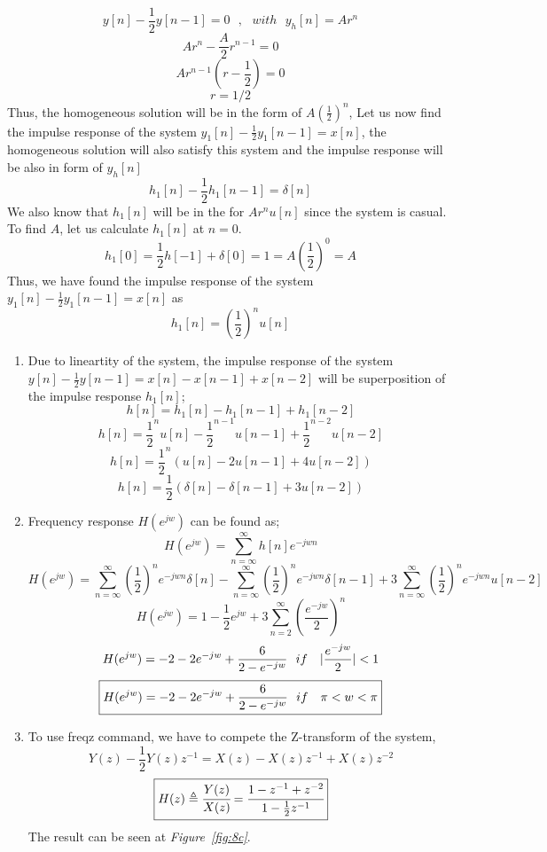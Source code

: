\documentclass[a4paper,12pt]{article}
\begin{document}
\begin{enumerate}
	$$	y[n]-\frac{1}{2}y[n-1]=0 ~~~,~~~with~~~y_h[n]=Ar^n	$$
	$$	Ar^n-\frac{A}{2}r^{n-1}=0	$$	
	$$ 	Ar^{n-1}(r-\frac{1}{2})=0	$$
	$$	\boxed {r=1/2} $$
	Thus, the homogeneous solution will be in the form of $A{(\frac{1}{2})}^{n}$,
	Let us now find the impulse response of the system $y_1[n]-\frac{1}{2}y_1[n-1]=x[n]$, the homogeneous solution will also satisfy this system and the impulse response will be also in form of  $y_h[n]$
	$$	h_1[n]-\frac{1}{2}h_1[n-1]=\delta [n] $$
	We also know that $h_1[n]$ will be in the for $Ar^nu[n]$ since the system is casual. To find $A$, let us calculate $h_1[n]$ at $n=0$.
	$$  h_1[0]=\frac{1}{2}h[-1]+\delta [0]=1=A{(\frac{1}{2})}^0=A $$
	Thus, we have found the impulse response of the system $y_1[n]-\frac{1}{2}y_1[n-1]=x[n]$ as
	$$ \boxed {h_1[n] = {( \frac{1}{2})}^nu[n]} $$
		\begin{enumerate}
			\item Due to lineartity of the system, the impulse response of the system \\ $y[n]-\frac{1}{2}y[n-1]=x[n]-x[n-1]+x[n-2]$ will be superposition of the impulse response $h_1[n]$;
			$$ h[n]=h_1[n]-h_1[n-1]+h_1[n-2] $$
			$$ h[n]={\frac{1}{2}}^nu[n]-{\frac{1}{2}}^{n-1}u[n-1]+{\frac{1}{2}}^{n-2}u[n-2] $$
			$$ 	h[n]={\frac{1}{2}}^n(u[n]-2u[n-1]+4u[n-2])	$$
			$$ \boxed{	h[n]={\frac{1}{2}}(\delta [n]-\delta [n-1] +3u[n-2]) }$$
			\item Frequency response $H(e^{jw})$ can be found as;
				$$	H(e^{jw})=\sum_{n=\infty}^{\infty}h[n]e^{-jwn}	$$
				$$	H(e^{jw})=\sum_{n=\infty}^{\infty}{(\frac{1}{2})}^ne^{-jwn}\delta [n]-\sum_{n=\infty}^{\infty} {(\frac{1}{2})}^ne^{-jwn}\delta [n-1] +3\sum_{n=\infty}^{\infty}{(\frac{1}{2})}^ne^{-jwn}u[n-2] $$
				$$	H(e^{jw})= 1-\frac{1}{2}e^{jw}+3\sum_{n=2}^{\infty}{(\frac{e^{-jw}}{2})}^n$$				
				$$	H(e^{jw})=-2-2e^{-jw}+\frac{6}{2-e^{-jw}} \-~~if~~~|\frac{e^{-jw}}{2}|<1$$
				$$	\boxed {H(e^{jw})=-2-2e^{-jw}+\frac{6}{2-e^{-jw}} ~~if~~~\-\pi<w<\pi}	$$
			\item 	To use freqz command, we have to compete the Z-transform of the system,
			$$	Y(z)-\frac{1}{2}Y(z)z^{-1}=X(z)-X(z)z^{-1}+X(z)z^{-2} $$
			$$	\boxed {H(z) \triangleq \cfrac{Y(z)}{X(z)} = \cfrac{1-z^{-1}+z^{-2}}{1-\frac{1}{2}z^{-1}} } $$
			The result can be seen at \textit{Figure~\ref{fig:8c}}.
				\begin{figure}[H]
					\centering
					\setlength{\unitlength}{\textwidth} 

\end{figure}
\end{enumerate}
\end{enumerate}
\end{document}
